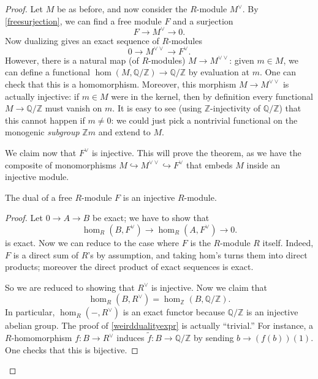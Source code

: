 \begin{proof}
  Let $M$ be as before,
and now consider the  $R$-module $M^{\vee}$.  By \cref{freesurjection}, we can
find a free
 module $F$ and a surjection
\[ F \to M^{\vee} \to 0.\]
Now dualizing gives an exact sequence of $R$-modules
\[ 0 \to M^{\vee \vee} \to F^{\vee}. \]
However, there is a natural map (of $R$-modules) $M \to M^{\vee \vee}$: given $m \in M$, we can
define a functional $\hom(M, \mathbb{Q}/\mathbb{Z}) \to \mathbb{Q}/\mathbb{Z}$
by evaluation at $m$. One can check that this is a homomorphism. Moreover, this morphism $M \to M^{\vee \vee}$ is actually injective: if $m \in M$ were
in the kernel, then by definition every functional $M \to
\mathbb{Q}/\mathbb{Z}$ must vanish on $m$. It is easy to see (using
$\mathbb{Z}$-injectivity of $\mathbb{Q}/\mathbb{Z}$) that this cannot happen
if $m \neq 0$: we could just pick a nontrivial functional on the monogenic
\emph{subgroup} $\mathbb{Z} m$ and extend to $M$.



We claim now that $F^{\vee}$ is injective.  This will prove the theorem, as
we have the composite of monomorphisms $M \hookrightarrow M^{\vee \vee} \hookrightarrow F^{\vee}$ that
embeds $M$ inside an injective module.

\begin{lemma} The dual of a  free $R$-module $F$ is an injective
$R$-module.
\end{lemma}
\begin{proof} 
Let $0 \to A \to B $ be exact; we have to show that
\[ \hom_R( B, F^\vee) \to \hom_R(A, F^\vee)  \to 0 .\]
is exact.
Now we can reduce to the case where $F$ is the $R$-module $R$ itself.
Indeed, $F$ is a direct sum of $R$'s by assumption, and taking hom's turns
them into direct products; moreover the direct product of
exact sequences is exact.

So we are reduced to showing that $R^{\vee}$ is injective.
Now we claim that
\begin{equation} \label{weirddualityexpr} \hom_R(B, R^{\vee}) =
\hom_{\mathbb{Z}}(B, \mathbb{Q}/\mathbb{Z}). \end{equation}
In particular, $\hom_R( -, R^\vee)$ is an exact functor because
$\mathbb{Q}/\mathbb{Z}$ is an injective abelian group.
The proof of \cref{weirddualityexpr} is actually ``trivial.''   For instance,
a $R$-homomorphism $f: B \to R^\vee$ induces $\tilde{f}: B \to
\mathbb{Q}/\mathbb{Z}$ by sending $b \to (f(b))(1)$.  One checks that this
is bijective.

\end{proof} 

\end{proof} 

